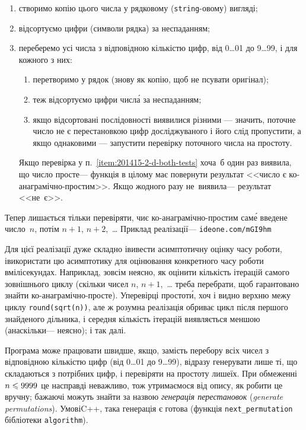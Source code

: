 \begin{enumerate}
\item
створимо копію цього числа у рядковому (\texttt{string}-овому) вигляді;
\item
відсортуємо цифри (символи рядка) за неспаданням;
\item
переберемо усі числа з відповідною кількістю цифр, від 0\dots01 до 9\dots99, і для кожного з них:
\begin{enumerate}
\item
перетворимо у рядок (знову як копію, щоб не псувати оригінал);
\item
теж відсортуємо цифри числ\'{а} за неспаданням;
\item \label{item:201415-2-d-both-tests}
якщо відсортовані послідовності виявилися різними --- значить, поточне число не є перестановкою цифр досліджуваного і його слід пропустити, а якщо однаковими --- запустити перевірку поточного числа на простоту.
\end{enumerate}
Якщо перевірка у п.~\ref{item:201415-2-d-both-tests} хоча~б один раз виявила, що число просте\nolinebreak[3] --- функція в цілому має повернути результат <<число є ко-ана\-гра\-мічно-простим>>. Якщо жодного разу не~виявила\nolinebreak[3] --- результат <<не~є>>.
\end{enumerate}

Тепер лишається тільки перевіряти, чи\nolinebreak[3] є ко-ана\-гра\-мічно-простим сам\'{е} введене число~$n$, потім $n{+}1$, $n{+}2$,~\dots{} Приклад реалізації\nolinebreak[3] --- \verb"ideone.com/mGI9hm"

Для цієї реалізації дуже складно і\nolinebreak[3] вивести асимптотичну оцінку часу роботи, і\nolinebreak[3] використати цю асимптотику для оцінювання конкретного часу роботи в\nolinebreak[3] мілісекундах. Наприклад, зовсім не\nolinebreak[3] ясно, як оцінити кількість ітерацій самого зовнішнього циклу (скільки чисел $n$, $n{+}1$,~\dots{} треба перебрати, щоб гарантовано знайти ко-ана\-гра\-мічно-просте). У\nolinebreak[3] перевірці простот\'{и}, хоч і видно верхню межу циклу \verb"round(sqrt(n))", але ж розумна реалізація обриває цикл після першого знайденого дільника, і середня кількість ітерацій виявляється меншою (а\nolinebreak[3] наскільки\nolinebreak[3] --- не\nolinebreak[3] ясно); і так далі.

Програма може працювати швидше, якщо, замість перебору всіх чисел з відповідною кількістю цифр (від 0\dots01 до 9\dots99), відразу генерувати лише ті, що складаються з потрібних цифр, і перевіряти на простоту лише\nolinebreak[3] їх. При обмеженні $n\leqslant9999$ це насправді неважливо, тож утримаємося від опису, як робити це вручну; бажаючі можуть знайти за назвою \emph{генерація перестановок} (\emph{generate permutations}). У\nolinebreak[3] мові\nolinebreak[2] C++, така генерація є готова (функція \verb"next_permutation" бібліотеки \verb"algorithm").

